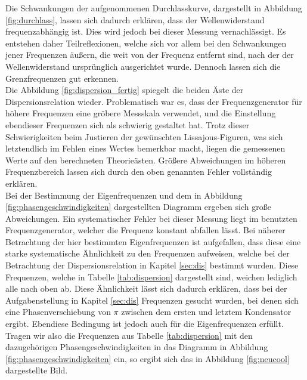 Die Schwankungen der aufgenommenen Durchlasskurve, dargestellt in Abbildung \ref{fig:durchlass}, lassen sich dadurch erklären, dass der Wellenwiderstand frequenzabhängig ist.
Dies wird jedoch bei dieser Messung vernachlässigt.
Es entstehen daher Teilreflexionen, welche sich vor allem bei den Schwankungen jener Frequenzen äußern, die weit von der Frequenz entfernt sind, nach der der Wellenwiderstand ursprünglich ausgerichtet wurde.
Dennoch lassen sich die Grenzfrequenzen gut erkennen.\\
Die Abbildung \ref{fig:dispersion_fertig} spiegelt die beiden Äste der Dispersionsrelation wieder.
Problematisch war es, dass der Frequenzgenerator für höhere Frequenzen eine gröbere Messskala verwendet, und die Einstellung ebendieser Frequenzen sich als schwierig gestaltet hat.
Trotz dieser Schwierigkeiten beim Justieren der gewünschten Lissajous-Figuren, was sich letztendlich im Fehlen eines Wertes bemerkbar macht, liegen die gemessenen Werte auf den berechneten Theorieästen.
Größere Abweichungen im höheren Frequenzbereich lassen sich durch den oben genannten Fehler vollständig erklären.\\
Bei der Bestimmung der Eigenfrequenzen und dem in Abbildung \ref{fig:phasengeschwindigkeiten} dargestellten Diagramm ergeben sich große Abweichungen.
Ein systematischer Fehler bei dieser Messung liegt im benutzten Frequenzgenerator, welcher die Frequenz konstant abfallen lässt.
Bei näherer Betrachtung der hier bestimmten Eigenfrequenzen ist aufgefallen, dass diese eine starke systematische Ähnlichkeit zu den Frequenzen aufweisen, welche bei der Betrachtung der Dispersionsrelation in Kapitel \ref{sec:dis} bestimmt wurden.
Diese Frequenzen, welche in Tabelle \ref{tab:dispersion} dargestellt sind, weichen lediglich alle nach oben ab.
Diese Ähnlichkeit lässt sich dadurch erklären, dass bei der Aufgabenstellung in Kapitel \ref{sec:dis} Frequenzen gesucht wurden, bei denen sich eine Phasenverschiebung von $\pi$ zwischen dem ersten und letztem Kondensator ergibt.
Ebendiese Bedingung ist jedoch auch für die Eigenfrequenzen erfüllt.
Tragen wir also die Frequenzen aus Tabelle \ref{tab:dispersion} mit den dazugehörigen Phasengeschwindigkeiten in das Diagramm in Abbildung \ref{fig:phasengeschwindigkeiten} ein, so ergibt sich das in Abbildung \ref{fig:neucool} dargestellte Bild.
